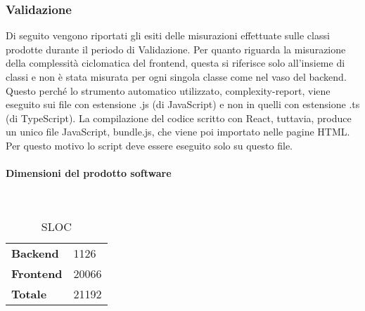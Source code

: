 \subsubsection{Validazione}
Di seguito vengono riportati gli esiti delle misurazioni effettuate sulle classi prodotte durante il periodo di Validazione.
Per quanto riguarda la misurazione della complessità ciclomatica del frontend, questa si riferisce solo all'insieme di classi e non è stata misurata per ogni singola classe come nel vaso del backend. Questo perché lo strumento automatico utilizzato, complexity-report, viene eseguito sui file con estensione .js (di JavaScript) e non in quelli con estensione .ts (di TypeScript). La compilazione del codice scritto con React, tuttavia, produce un unico file JavaScript, bundle.js, che viene poi importato nelle pagine HTML. Per questo motivo lo script deve essere eseguito solo su questo file.

\paragraph{Dimensioni del prodotto software} \mbox{} \\
\begin{table}[H]
\centering
\begin{tabular}{|l|l|}
\cline{1-2}
\textbf{Backend} & 1126 \\ \cline{1-2} 
\textbf{Frontend} & 20066 \\ \cline{1-2} 
\textbf{Totale} & 21192 \\ \cline{1-2}
\end{tabular}
\caption{SLOC}
\end{table}

